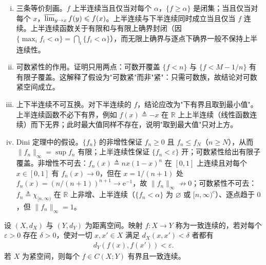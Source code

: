 \documentclass[../main.tex]{subfiles}
\begin{document}
\begin{remark}\label{remark:appA-半连续}
\begin{enumerate}[(i)]
\item 三条等价刻画。$f$ 上半连续当且仅当对每个 $\alpha$，$\{f\geqslant\alpha\}$ 是闭集；当且仅当对每个 $x$，$\varlimsup_{y\to x}f(y)\leqslant f(x)$。上半连续与下半连续同时成立当且仅当 $f$ 连续。上半连续函数关于有限和与有限上确界封闭（因 $\{\max_if_i<\alpha\}=\bigcap_i\{f_i<\alpha\}$），而无限上确界与逐点下确界一般不保持上半连续性。
\item 可数紧性的作用。证明只用两点：可数开覆盖 $\{f<n\}$ 与 $\{f<M-1/n\}$ 有有限子覆盖。这解释了假设为"可数紧"而非"紧"：只需可数族，故结论对可数紧空间成立。
\item 上下半连续不可互换。对下半连续的 $f$，结论应改为"下有界且取到最小值"。上半连续函数不必下有界，例如 $f(x)\triangleq-x$ 在 $\mathbb{R}$ 上上半连续（线性函数连续）而下无界；此时最大值同样不存在，说明"取到最大值"只对上方。
\item Dini 定理中的假设。$\{f_n\}$ 的非增性保证 $f_n\geqslant0$ 且 $f_n\leqslant f_N$（$n\geqslant N$），从而 $\|f_n\|_\infty=\sup f_n$ 有限；上半连续性保证 $\{f_n<\varepsilon\}$ 开；可数紧性给出有限子覆盖。非增性不可去：$f_n(x)\triangleq nx(1-x)^n$ 在 $[0,1]$ 上连续且对每个 $x\in[0,1]$ 有 $f_n(x)\to0$，但在 $x=1/(n+1)$ 处 $f_n(x)=(n/(n+1))^{n+1}\to\mathrm{e}^{-1}$，故 $\|f_n\|_\infty\not\to0$；可数紧性不可去：$f_n\triangleq\chi_{[n,\infty)}$ 在 $\mathbb{R}$ 上非增、上半连续（$\{f_n<\alpha\}$ 为 $\varnothing$ 或 $[n,\infty)^c$）、逐点趋于 $0$，但 $\|f_n\|_\infty=1$。
\end{enumerate}
\end{remark}

\begin{definition}[一致连续]\label{definition:appA-一致连续}
设 $(X,d_X)$ 与 $(Y,d_Y)$ 为距离空间。映射 $f:X\to Y$ 称为一致连续的，若对每个 $\varepsilon>0$ 存在 $\delta>0$，使对一切 $x,x'\in X$ 满足 $d_X(x,x')<\delta$ 者都有
\begin{align*}
d_Y(f(x),f(x'))<\varepsilon.
\end{align*}
若 $X$ 为紧空间，则每个 $f\in C(X;Y)$ 有界且一致连续。
\end{definition}
\end{document}
